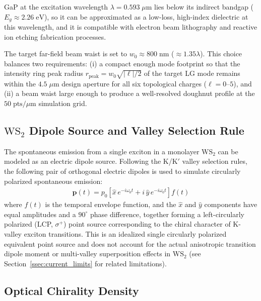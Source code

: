 GaP at the excitation wavelength $\lambda = 0.593\;\mu\text{m}$ lies below its indirect bandgap ($E_g \approx 2.26\;\text{eV}$), so it can be approximated as a low-loss, high-index dielectric at this wavelength, and it is compatible with electron beam lithography and reactive ion etching fabrication processes.

The target far-field beam waist is set to $w_0 \approx 800\;\text{nm}$ ($\approx 1.35\lambda$). This choice balances two requirements: (i) a compact enough mode footprint so that the intensity ring peak radius $r_\text{peak} = w_0\sqrt{|\ell|/2}$ of the target LG mode remains within the $4.5\;\mu$m design aperture for all six topological charges ($\ell = 0$--$5$), and (ii) a beam waist large enough to produce a well-resolved doughnut profile at the $50\;\text{pts}/\mu$m simulation grid.

\subsection{$\text{WS}_2$ Dipole Source and Valley Selection Rule}

The spontaneous emission from a single exciton in a monolayer $\text{WS}_2$ can be modeled as an electric dipole source. Following the K/K$'$ valley selection rules, the following pair of orthogonal electric dipoles is used to simulate circularly polarized spontaneous emission:
\begin{align}
\mathbf{p} (t) = p_0\!\left[\hat{x}\,e^{-i\omega_0 t} + i\,\hat{y}\,e^{-i\omega_0 t}\right] f (t)
\end{align}
where $f (t)$ is the temporal envelope function, and the $\hat{x}$ and $\hat{y}$ components have equal amplitudes and a $90^{\circ}$ phase difference, together forming a left-circularly polarized (LCP, $\sigma^+$) point source corresponding to the chiral character of K-valley exciton transitions. This is an idealized single circularly polarized equivalent point source and does not account for the actual anisotropic transition dipole moment or multi-valley superposition effects in $\text{WS}_2$ (see Section~\ref{ssec:current_limits} for related limitations).

\subsection{Optical Chirality Density}

\label{ssec:chirality_def}

